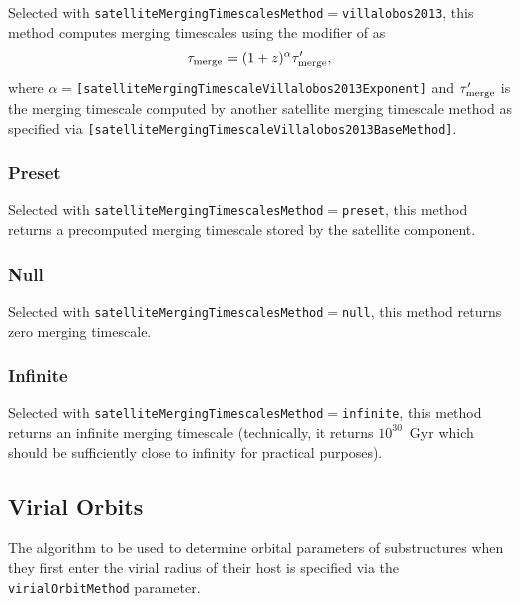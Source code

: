 Selected with {\tt satelliteMergingTimescalesMethod}$=${\tt villalobos2013}, this method computes merging timescales using the modifier of \cite{villalobos_improved_2013} as
\begin{equation}
\tau_{\rm merge} = (1+z)^\alpha \tau^\prime_{\rm merge},
\end{equation}
where $\alpha=${\tt [satelliteMergingTimescaleVillalobos2013Exponent]} and $\tau^\prime_{\rm merge}$ is the merging timescale computed by another satellite merging timescale method as specified via {\tt [satelliteMergingTimescaleVillalobos2013BaseMethod]}.

\subsubsection{Preset}\label{phys:satelliteMergingTimescales:satelliteMergingTimescalesPreset}

Selected with {\tt satelliteMergingTimescalesMethod}$=${\tt preset}, this method returns a precomputed merging timescale stored by the satellite component.

\subsubsection{Null}\label{phys:satelliteMergingTimescales:satelliteMergingTimescalesNull}

Selected with {\tt satelliteMergingTimescalesMethod}$=${\tt null}, this method returns zero merging timescale.

\subsubsection{Infinite}\label{phys:satelliteMergingTimescales:satelliteMergingTimescalesInfinite}

Selected with {\tt satelliteMergingTimescalesMethod}$=${\tt infinite}, this method returns an infinite merging timescale (technically, it returns $10^{30}$~Gyr which should be sufficiently close to infinity for practical purposes).

\subsection{Virial Orbits}

The algorithm to be used to determine orbital parameters of substructures when they first enter the virial radius of their host is specified via the {\tt virialOrbitMethod} parameter.

